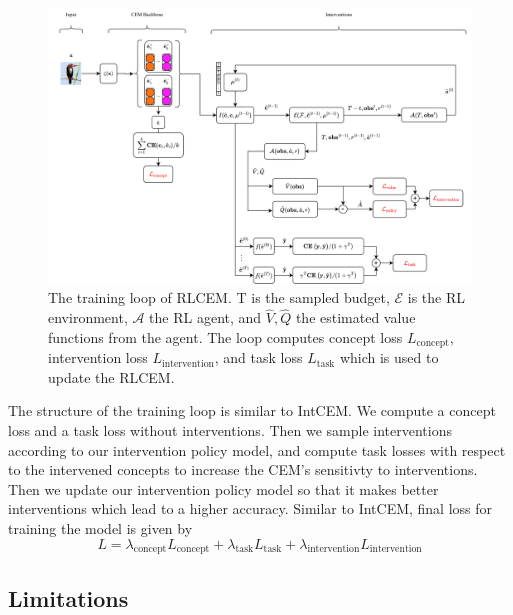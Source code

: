\begin{figure}
    \centering
    \includegraphics*[width=\textwidth]{figs/method/rlcem.png}
    \caption{The training loop of RLCEM. T is the sampled budget, $\mathcal{E}$ is the RL environment, $\mathcal{A}$ the RL agent, 
    and $\hat{V}, \hat{Q}$ the estimated value functions from the agent. The loop computes concept loss $L_{\text{concept}}$,
    intervention loss $L_{\text{intervention}}$, and task loss $L_{\text{task}}$ which is used to update the
    RLCEM.}
    \label{fig:rlcem}
\end{figure}

The structure of the training loop is similar to IntCEM.
 We compute a concept loss
and a task loss without interventions.
Then we sample interventions according to our intervention policy model,
and compute task losses with respect to the intervened concepts to increase 
the CEM's sensitivty to interventions. Then we update our intervention policy
model so that it makes better interventions which lead to a higher accuracy.
Similar to IntCEM, final loss for training the model is given by 
\[L = \lambda_{\text{concept}} L_{\text{concept}}
+  \lambda_{\text{task}} L_{\text{task}}
+  \lambda_{\text{intervention}} L_{\text{intervention}}\]

\subsection{Limitations}


